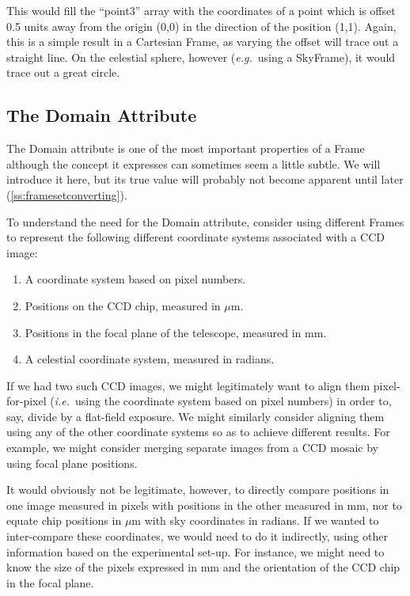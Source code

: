 \documentclass[twoside,11pt]{article}
\newcommand{\htmlref}[2]{#1}
\newcommand{\secref}[1]{\S\ref{#1}}
\renewcommand{\secref}[1]{\ref{#1}}
\begin{document}
This would fill the ``point3'' array with the coordinates of a point
which is offset 0.5 units away from the origin (0,0) in the direction
of the position (1,1). Again, this is a simple result in a Cartesian
Frame, as varying the offset will trace out a straight line. On the
celestial sphere, however ({\em{e.g.}}\ using a SkyFrame), it would
trace out a great circle.

\subsection{\label{ss:framedomains}The Domain Attribute}

The \htmlref{Domain}{Domain} attribute is one of the most important properties of a
\htmlref{Frame}{Frame} although the concept it expresses can sometimes seem a little
subtle.  We will introduce it here, but its true value will probably
not become apparent until later (\secref{ss:framesetconverting}).

To understand the need for the Domain attribute, consider using
different Frames to represent the following different coordinate
systems associated with a CCD image:

\begin{enumerate}
\item A coordinate system based on pixel numbers.

\item Positions on the CCD chip, measured in $\mu$m.

\item Positions in the focal plane of the telescope, measured in mm.

\item A celestial coordinate system, measured in radians.
\end{enumerate}

If we had two such CCD images, we might legitimately want to align
them pixel-for-pixel ({\em{i.e.}}\ using the coordinate system based
on pixel numbers) in order to, say, divide by a flat-field exposure.
We might similarly consider aligning them using any of the other
coordinate systems so as to achieve different results. For example, we
might consider merging separate images from a CCD mosaic by using
focal plane positions.

It would obviously not be legitimate, however, to directly compare
positions in one image measured in pixels with positions in the other
measured in mm, nor to equate chip positions in $\mu$m with sky
coordinates in radians. If we wanted to inter-compare these
coordinates, we would need to do it indirectly, using other
information based on the experimental set-up. For instance, we might
need to know the size of the pixels expressed in mm and the
orientation of the CCD chip in the focal plane.
\end{document}
